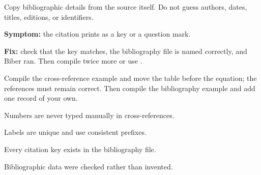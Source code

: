 Copy bibliographic details from the source itself. Do not guess authors,
dates, titles, editions, or identifiers.

\begin{commonerror}
\textbf{Symptom:} the citation prints as a key or a question mark.

\textbf{Fix:} check that the key matches, the bibliography file is named
correctly, and Biber ran. Then compile twice more or use .
\end{commonerror}

\begin{codelab}
Compile the cross-reference example and move the table before the equation;
the references must remain correct. Then compile the bibliography example and
add one record of your own.
\end{codelab}

\begin{chapterchecklist}
  \item Numbers are never typed manually in cross-references.
  \item Labels are unique and use consistent prefixes.
  \item Every citation key exists in the bibliography file.
  \item Bibliographic data were checked rather than invented.
\end{chapterchecklist}
